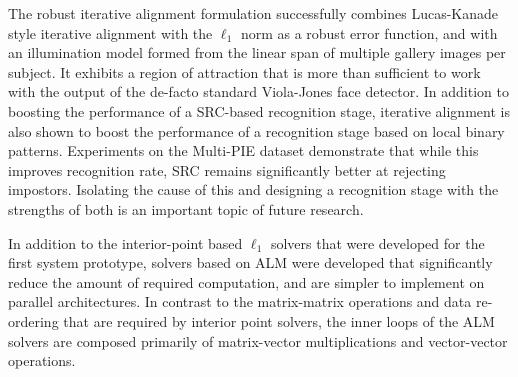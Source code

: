 The robust iterative alignment formulation successfully combines Lucas-Kanade
style iterative alignment with the $\ell_1$ norm as a robust error function,
and with an illumination model formed from the linear span of multiple gallery
images per subject.  It exhibits a region of attraction that is more than
sufficient to work with the output of the de-facto standard Viola-Jones face
detector.  In addition to boosting the performance of a SRC-based recognition
stage, iterative alignment is also shown to boost the performance of a
recognition stage based on local binary patterns.  Experiments on the Multi-PIE
dataset demonstrate that while this improves recognition rate, SRC remains
significantly better at rejecting impostors.  Isolating the cause of this and
designing a recognition stage with the strengths of both is an important topic
of future research.

In addition to the interior-point based $\ell_1$ solvers that were developed
for the first system prototype, solvers based on ALM were developed that
significantly reduce the amount of required computation, and are simpler 
to implement on parallel architectures.  In contrast to the matrix-matrix
operations and data re-ordering that are required by interior point solvers,
the inner loops of the ALM solvers are composed primarily of matrix-vector
multiplications and vector-vector operations.

